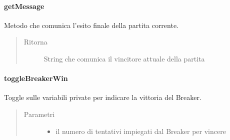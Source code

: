 \documentclass[letterpaper,10pt,italian,openany,oneside]{sphinxmanual}
\begin{document}
\paragraph{getMessage}
\label{\detokenize{source/it/unicam/cs/pa/mastermind/gamecore/CurrentGameStats:getmessage}}

\begin{fulllineitems}
\label{\detokenize{source/it/unicam/cs/pa/mastermind/gamecore/CurrentGameStats:it.unicam.cs.pa.mastermind.gamecore.CurrentGameStats.getMessage()}}
Metodo che comunica l’esito finale della partita corrente.
\begin{quote}\begin{description}
\item[{Ritorna}] \leavevmode
String che comunica il vincitore attuale della partita

\end{description}\end{quote}

\end{fulllineitems}



\paragraph{toggleBreakerWin}
\label{\detokenize{source/it/unicam/cs/pa/mastermind/gamecore/CurrentGameStats:togglebreakerwin}}

\begin{fulllineitems}
\label{\detokenize{source/it/unicam/cs/pa/mastermind/gamecore/CurrentGameStats:it.unicam.cs.pa.mastermind.gamecore.CurrentGameStats.toggleBreakerWin(int)}}
Toggle sulle variabili private per indicare la vittoria del Breaker.
\begin{quote}\begin{description}
\item[{Parametri}] \leavevmode\begin{itemize}
\item {} 
 \textendash{} il numero di tentativi impiegati dal Breaker per vincere

\end{itemize}

\end{description}\end{quote}

\end{fulllineitems}
\end{document}
